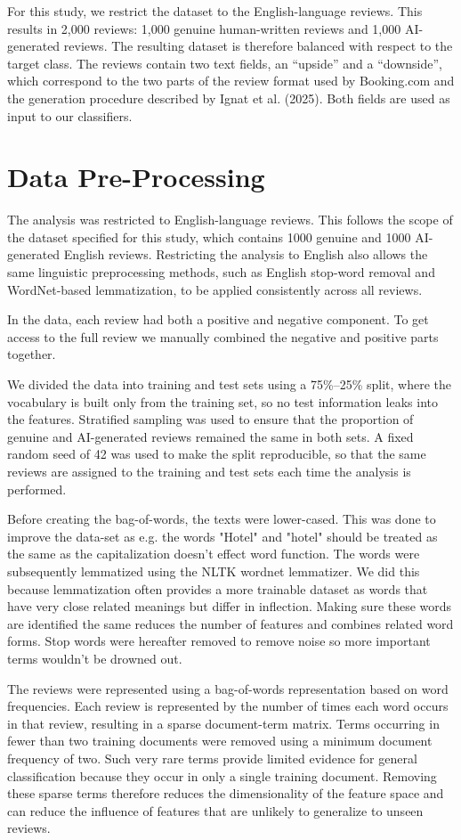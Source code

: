 \documentclass{article}
\begin{document}
For this study, we restrict the dataset to the English-language reviews. This results in 2,000 reviews: 1,000 genuine human-written reviews and 1,000 AI-generated reviews. The resulting dataset is therefore balanced with respect to the target class. The reviews contain two text fields, an ``upside'' and a ``downside'', which correspond to the two parts of the review format used by Booking.com and the generation procedure described by Ignat et al. (2025). Both fields are used as input to our classifiers.

\section{Data Pre-Processing}
The analysis was restricted to English-language reviews. This follows the scope of the dataset specified for this study, which contains 1000 genuine and 1000 AI-generated English reviews. Restricting the analysis to English also allows the same linguistic preprocessing methods, such as English stop-word removal and WordNet-based lemmatization, to be applied consistently across all reviews. 

In the data, each review had both a positive and negative component. To get access to the full review we manually combined the negative and positive parts together. 

We divided the data into training and test sets using a 75\%--25\% split, where the vocabulary is built only from the training set, so no test information leaks into the features. Stratified sampling was used to ensure that the proportion of genuine and AI-generated reviews remained the same in both sets. A fixed random seed of 42 was used to make the split reproducible, so that the same reviews are assigned to the training and test sets each time the analysis is performed.

Before creating the bag-of-words, the texts were lower-cased. This was done to improve the data-set as e.g. the words "Hotel" and "hotel" should be treated as the same as the capitalization doesn't effect word function. The words were subsequently lemmatized using the NLTK wordnet lemmatizer. We did this because lemmatization often provides a more trainable dataset as words that have very close related meanings but differ in inflection. Making sure these words are identified the same reduces the number of features and combines related word forms. Stop words were hereafter removed to remove noise so more important terms wouldn't be drowned out.

The reviews were represented using a bag-of-words representation based on word frequencies. Each review is represented by the number of times each word occurs in that review, resulting in a sparse document-term matrix. Terms occurring in fewer than two training documents were removed using a minimum document frequency of two. Such very rare terms provide limited evidence for general classification because they occur in only a single training document. Removing these sparse terms therefore reduces the dimensionality of the feature space and can reduce the influence of features that are unlikely to generalize to unseen reviews.
\end{document}
